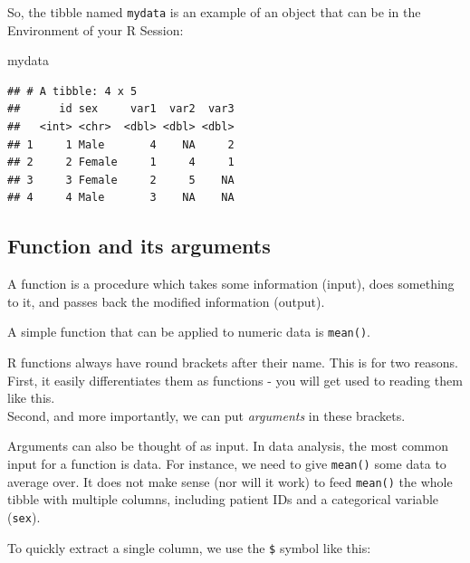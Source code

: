 \documentclass[
  12pt,
  krantz2]{krantz}
\makeatletter
\newenvironment{Shaded}{\begin{snugshade}}{\end{snugshade}}
\newcommand{\NormalTok}[1]{#1}
\newcommand{\OperatorTok}[1]{\textcolor[rgb]{0.81,0.36,0.00}{\textbf{#1}}}
\newenvironment{kframe}{%
\medskip{}
\setlength{\fboxsep}{.8em}
 \def\at@end@of@kframe{}%
 \ifinner\ifhmode%
  \def\at@end@of@kframe{\end{minipage}}%
  \begin{minipage}{\columnwidth}%
 \fi\fi%
 \def\FrameCommand##1{\hskip\@totalleftmargin \hskip-\fboxsep
 \colorbox{shadecolor}{##1}\hskip-\fboxsep
     \hskip-\linewidth \hskip-\@totalleftmargin \hskip\columnwidth}%
 \MakeFramed {\advance\hsize-\width
   \@totalleftmargin\z@ \linewidth\hsize
   \@setminipage}}%
 {\par\unskip\endMakeFramed%
 \at@end@of@kframe}
\renewenvironment{Shaded}{\begin{kframe}}{\end{kframe}}
\makeatother
\begin{document}
So, the tibble named \texttt{mydata} is an example of an object that can be in the Environment of your R Session:

\begin{Shaded}
\begin{Highlighting}[]
\NormalTok{mydata}
\end{Highlighting}
\end{Shaded}

\begin{verbatim}
## # A tibble: 4 x 5
##      id sex     var1  var2  var3
##   <int> <chr>  <dbl> <dbl> <dbl>
## 1     1 Male       4    NA     2
## 2     2 Female     1     4     1
## 3     3 Female     2     5    NA
## 4     4 Male       3    NA    NA
\end{verbatim}

\hypertarget{function-and-its-arguments}{%
\subsection{Function and its arguments}\label{function-and-its-arguments}}

A function is a procedure which takes some information (input), does something to it, and passes back the modified information (output).

A simple function that can be applied to numeric data is \texttt{mean()}.

R functions always have round brackets after their name.
This is for two reasons.
First, it easily differentiates them as functions - you will get used to reading them like this.\\
Second, and more importantly, we can put \emph{arguments} in these brackets.

Arguments can also be thought of as input.
In data analysis, the most common input for a function is data.
For instance, we need to give \texttt{mean()} some data to average over.
It does not make sense (nor will it work) to feed \texttt{mean()} the whole tibble with multiple columns, including patient IDs and a categorical variable (\texttt{sex}).

To quickly extract a single column, we use the \texttt{\$} symbol like this:

\begin{Shaded}
\end{Shaded}
\end{document}
